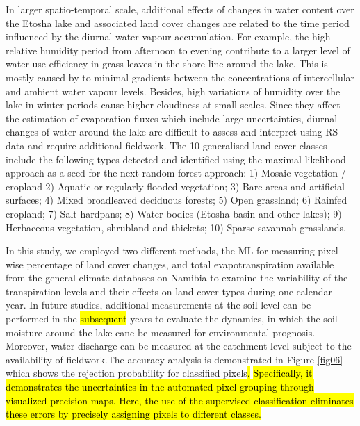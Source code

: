 \documentclass[climate,article,submit,pdftex,moreauthors]{Definitions/mdpi}
\begin{document}
 {In larger spatio-temporal scale, additional effects of changes in water content over the Etosha lake and associated land cover changes are related to the time period influenced by the diurnal water vapour accumulation. For example, the high relative humidity period from afternoon to evening contribute to a larger level of water use efficiency in grass leaves in the shore line around the lake. This is mostly caused by to minimal gradients between the concentrations of intercellular and ambient water vapour levels. Besides, high variations of humidity over the lake in winter periods cause higher cloudiness at small scales. Since they affect the estimation of evaporation fluxes which include large uncertainties, diurnal changes of water around the lake are difficult to assess and interpret using RS data and require additional fieldwork.} The 10 generalised land cover classes include the following types detected and identified using the maximal likelihood approach as a seed for the next random forest approach: 1) Mosaic vegetation / cropland 2) Aquatic or regularly flooded vegetation; 3) Bare areas and artificial surfaces; 4) Mixed broadleaved deciduous forests; 5) Open grassland; 6) Rainfed cropland; 7) Salt hardpans; 8) Water bodies (Etosha basin and other lakes); 9) Herbaceous vegetation, shrubland and thickets; 10) Sparse savannah grasslands.

 {In this study, we employed two different methods, the ML for measuring pixel-wise percentage of land cover changes, and total evapotranspiration available from the general climate databases on Namibia to examine the variability of the transpiration levels and their effects on land cover types during one calendar year. In future studies, additional measurements at the soil level can be performed in\hl{ }the \hl{subsequent} years to evaluate the dynamics, in which the soil moisture around the lake cane be measured for environmental prognosis. Moreover, water discharge can be measured at the catchment level subject to the availability of fieldwork.}The accuracy analysis is demonstrated in Figure \ref{fig06} which shows the rejection probability for classified pixels\hl{.} \hl{Specifically, it demonstrates the uncertainties in the automated pixel grouping through visualized precision maps. Here, the use of the supervised classification eliminates these errors by precisely assigning pixels to different classes.}
 
\end{document}
